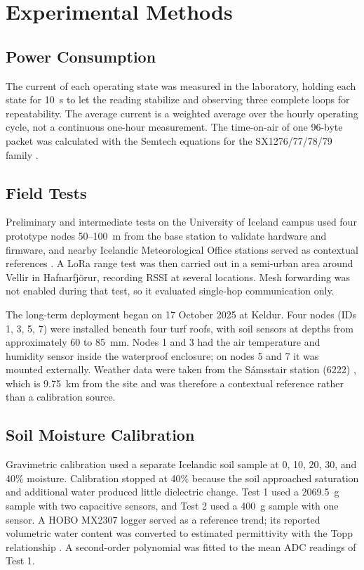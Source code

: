 \documentclass[conference]{IEEEtran}
\begin{document}
\section{Experimental Methods}\label{sec:method}
\subsection{Power Consumption}
The current of each operating state was measured in the laboratory, holding each state for 10~s to let the reading stabilize and observing three complete loops for repeatability. The average current is a weighted average over the hourly operating cycle, not a continuous one-hour measurement. The time-on-air of one 96-byte packet was calculated with the Semtech equations for the SX1276/77/78/79 family \cite{semtech2020sx1276}.

\subsection{Field Tests}
Preliminary and intermediate tests on the University of Iceland campus used four prototype nodes 50--100~m from the base station to validate hardware and firmware, and nearby Icelandic Meteorological Office stations served as contextual references \cite{imo_observations}. A LoRa range test was then carried out in a semi-urban area around Vellir in Hafnarfj\"{o}r\dh ur, recording RSSI at several locations. Mesh forwarding was not enabled during that test, so it evaluated single-hop communication only.

The long-term deployment began on 17 October 2025 at Keldur. Four nodes (IDs 1, 3, 5, 7) were installed beneath four turf roofs, with soil sensors at depths from approximately 60 to 85~mm. Nodes 1 and 3 had the air temperature and humidity sensor inside the waterproof enclosure; on nodes 5 and 7 it was mounted externally. Weather data were taken from the S\'amssta\dh ir station (6222) \cite{imo_observations}, which is 9.75~km from the site and was therefore a contextual reference rather than a calibration source.

\subsection{Soil Moisture Calibration}
Gravimetric calibration used a separate Icelandic soil sample at 0, 10, 20, 30, and 40\% moisture. Calibration stopped at 40\% because the soil approached saturation and additional water produced little dielectric change. Test 1 used a 2069.5~g sample with two capacitive sensors, and Test 2 used a 400~g sample with one sensor. A HOBO MX2307 logger \cite{onset_mx2307} served as a reference trend; its reported volumetric water content was converted to estimated permittivity with the Topp relationship \cite{topp1980}. A second-order polynomial was fitted to the mean ADC readings of Test 1.
\end{document}
